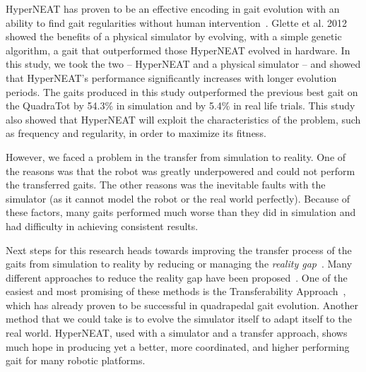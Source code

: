 HyperNEAT has proven to be an effective encoding in gait evolution with an ability to find gait regularities without human intervention~\cite{clune2009evolving,clune2011performance,yos:clune}. Glette et al. 2012~\cite{glette} showed the benefits of a physical simulator by evolving, with a simple genetic algorithm, a gait that outperformed those HyperNEAT evolved in hardware.
In this study, we took the two -- HyperNEAT and a physical simulator -- and showed that HyperNEAT's performance significantly increases with longer evolution periods. The gaits produced in this study outperformed the previous best gait on the QuadraTot by 54.3\% in simulation and by 5.4\% in real life trials. This study also showed that HyperNEAT will exploit the characteristics of the problem, such as frequency and regularity, in order to maximize its fitness.


However, we faced a problem in the transfer from simulation to reality. %
One of the reasons was that the robot was greatly underpowered and could not perform the transferred gaits. The other reasons was the inevitable faults with the simulator (as it cannot model the robot or the real world perfectly). Because of these factors, many gaits performed much worse than they did in simulation and had difficulty in achieving consistent results. 


Next steps for this research heads towards improving the transfer process of the gaits from simulation to reality by reducing or managing the \emph{reality gap}~\cite{jakobi}. Many different approaches to reduce the reality gap have been proposed~\cite{koos2010crossing,bongard,zagal}. One of the easiest and most promising of these methods is the Transferability Approach~\cite{koos2011transferability}, which has already proven to be successful in quadrapedal gait evolution. Another method that we could take is to evolve the simulator itself to adapt itself to the real world. HyperNEAT, used with a simulator and a transfer approach, shows much hope in producing yet a better, more coordinated, and higher performing gait for many robotic platforms.
